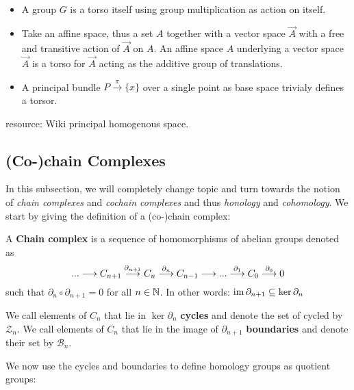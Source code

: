 \begin{example}~
\begin{itemize}
  \item A group $G$ is a torso itself using group multiplication as action on itself.

  \item Take an affine space, thus a set $A$ together with a vector space $\vec{A}$ with a free and transitive action of $\vec{A}$ on $A$. An affine space $A$ underlying a vector space $\vec{A}$ is a torso for $\vec{A}$ acting as the additive group of translations.

  \item A principal bundle $P \overset{\pi}{\longrightarrow} \{x\}$ over a single point as base space trivialy defines a torsor.
\end{itemize}
\end{example}

resource: Wiki principal homogenous space.

\subsection{(Co-)chain Complexes}

In this subsection, we will completely change topic and turn towards the notion of \emph{chain complexes} and \emph{cochain complexes} and thus \emph{honology} and \emph{cohomology}. We start by giving the definition of a (co-)chain complex:

\begin{definition}
  A \textbf{Chain complex} is a sequence of homomorphisms of abelian groups denoted as
  $$ ... \longrightarrow C_{n+1} \overset{\partial_{n+1}}{\longrightarrow} C_{n} \overset{\partial_{n}}{\longrightarrow} C_{n-1} \longrightarrow ... \overset{\partial_{1}}{\longrightarrow} C_{0} \overset{\partial_{0}}{\longrightarrow} 0$$
  such that $\partial_n \circ \partial_{n+1} = 0$ for all $n \in \mathbb{N}$. In other words: $\operatorname{im} \partial_{n+1} \subseteq \ker \partial_n$
\end{definition}

\begin{definition}
  We call elements of $C_n$ that lie in $\ker \partial_n$ \textbf{cycles} and denote the set of cycled by $\mathcal{Z}_n$. We call elements of $C_n$ that lie in the image of $\partial_{n+1}$ \textbf{boundaries} and denote their set by $\mathcal{B}_n$.
\end{definition}

We now use the cycles and boundaries to define homology groups as quotient groups:

